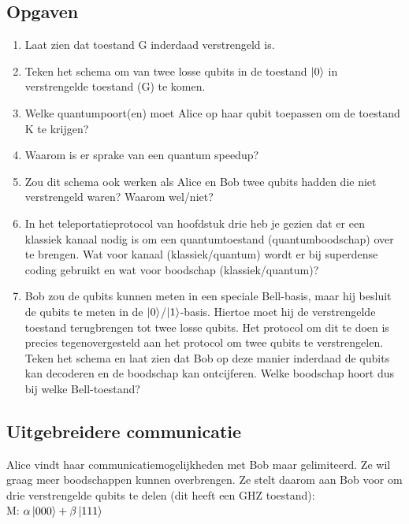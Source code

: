 \documentclass[10pt, a4paper]{article}
\begin{document}
\subsection*{Opgaven}
\begin{enumerate}[label=(\alph*)]
\item Laat zien dat toestand G inderdaad verstrengeld is.
\item Teken het schema om van twee losse qubits in de toestand $\ket{0}$ in verstrengelde toestand (G) te komen.
\item Welke quantumpoort(en) moet Alice op haar qubit toepassen om de toestand K te krijgen?
\item Waarom is er sprake van een quantum speedup?
\item Zou dit schema ook werken als Alice en Bob twee qubits hadden die niet verstrengeld waren? Waarom wel/niet?
\item In het teleportatieprotocol van hoofdstuk drie heb je gezien dat er een klassiek kanaal nodig is om een quantumtoestand (quantumboodschap) over te brengen. Wat voor kanaal (klassiek/quantum) wordt er bij superdense coding gebruikt en wat voor boodschap (klassiek/quantum)?
\item Bob zou de qubits kunnen meten in een speciale Bell-basis, maar hij besluit de qubits te meten in de $\ket{0}$/$\ket{1}$-basis. Hiertoe moet hij de verstrengelde toestand terugbrengen tot twee losse qubits. Het protocol om dit te doen is precies tegenovergesteld aan het protocol om twee qubits te verstrengelen. Teken het schema en laat zien dat Bob op deze manier inderdaad de qubits kan decoderen en de boodschap kan ontcijferen. Welke boodschap hoort dus bij welke Bell-toestand?
\end{enumerate}

\subsection*{Uitgebreidere communicatie}
Alice vindt haar communicatiemogelijkheden met Bob maar gelimiteerd. Ze wil graag meer boodschappen kunnen overbrengen. Ze stelt daarom aan Bob voor om drie verstrengelde qubits te delen (dit heeft een GHZ toestand):\\

M: $\alpha\ket{000}+\beta\ket{111}$\\
\end{document}
